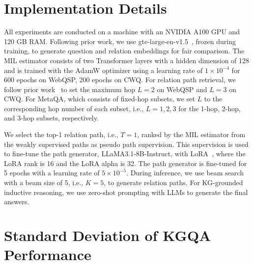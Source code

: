 \documentclass{article}
\begin{document}
\section{Implementation Details}\label{app:implementation}

All experiments are conducted on a machine with an NVIDIA A100 GPU and 120 GB RAM.
Following prior work, we use gte-large-en-v1.5~\citep{li_gte_2023}, frozen during training, to generate question and relation embeddings for fair comparison.
The MIL estimator consists of two Transformer layers with a hidden dimension of 128 and is trained with the AdamW optimizer using a learning rate of $1\times10^{-4}$ for 600 epochs on WebQSP, 200 epochs on CWQ.
For relation path retrieval, we follow prior work~\citep{li_subgraphrag_2025, ma_dp_2025} to set the maximum hop $L=2$ on WebQSP and $L=3$ on CWQ. For MetaQA, which consists of fixed-hop subsets, we set $L$ to the corresponding hop number of each subset, i.e., $L=1,2,3$ for the 1-hop, 2-hop, and 3-hop subsets, respectively.


We select the top-1 relation path, i.e., $T=1$, ranked by the MIL estimator from the weakly supervised paths as pseudo path supervision.
This supervision is used to fine-tune the path generator, LLaMA3.1-8B-Instruct, with LoRA~\citep{hu_lora_2021}, where the LoRA rank is 16 and the LoRA alpha is 32.
The path generator is fine-tuned for 5 epochs with a learning rate of $5\times10^{-5}$.
During inference, we use beam search with a beam size of 5, i.e., $K=5$, to generate relation paths.
For KG-grounded inductive reasoning, we use zero-shot prompting with LLMs to generate the final answers.

\section{Standard Deviation of KGQA Performance}\label{app:deviation}
\end{document}
